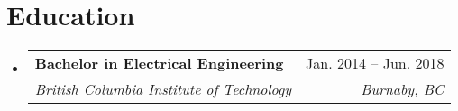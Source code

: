 \documentclass[letterpaper,11pt]{article}
\makeatletter
\newcommand{\resumeSubheading}[4]{
	\vspace{-1pt}\item
		\begin{tabular*}{0.97\textwidth}[t]{l@{\extracolsep{\fill}}r}
			\textbf{#1} & #2 \\
			\textit{\small#3} & \textit{\small #4} \\
		\end{tabular*}
	\vspace{-5pt}
}
\newcommand{\resumeSubHeadingListStart}{\begin{itemize}[leftmargin=*]}
\newcommand{\resumeSubHeadingListEnd}{\end{itemize}}
\makeatother
\begin{document}
\section{Education}
	\resumeSubHeadingListStart
		\resumeSubheading
			{Bachelor in Electrical Engineering}{Jan. 2014 -- Jun. 2018}
			{British Columbia Institute of Technology}{Burnaby, BC}
	\resumeSubHeadingListEnd



\end{document}
